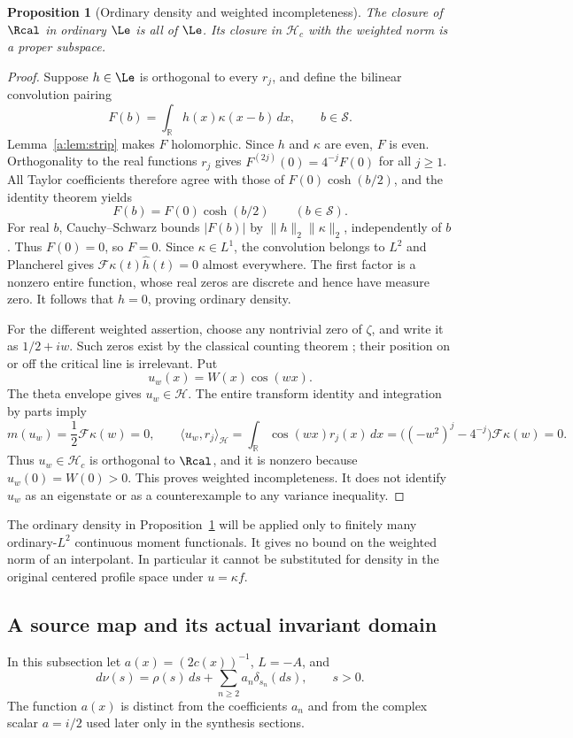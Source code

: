 \documentclass[11pt,a4paper]{article}
\numberwithin{equation}{section}
\newtheorem{proposition}[theorem]{Proposition}
\theoremstyle{definition}\newtheorem{definition}[theorem]{Definition}
\theoremstyle{remark}\newtheorem{remark}[theorem]{Remark}
\newcommand{\R}{\mathbb R}\newcommand{\C}{\mathbb C}\newcommand{\N}{\mathbb N}
\newcommand{\Hh}{\mathcal H}\newcommand{\Hw}{\mathcal H}
\newcommand{\ip}[2]{\langle#1,#2\rangle}\newcommand{\norm}[1]{\lVert#1\rVert}\newcommand{\abs}[1]{\lvert#1\rvert}
\begin{document}
\begin{proposition}[Ordinary density and weighted incompleteness]\label{a:prop:density}
The closure of $\Rcal$ in ordinary $\Le$ is all of $\Le$. Its closure in $\Hh_c$ with the weighted norm is a proper subspace.
\end{proposition}
\begin{proof}
Suppose $h\in\Le$ is orthogonal to every $r_j$, and define the bilinear convolution pairing
\[
 F(b)=\int_\R h(x)\kappa(x-b)\,dx,\qquad b\in\mathcal S.
\]
Lemma~\ref{a:lem:strip} makes $F$ holomorphic. Since $h$ and $\kappa$ are even, $F$ is even. Orthogonality to the real functions $r_j$ gives
$F^{(2j)}(0)=4^{-j}F(0)$ for all $j\ge1$.
All Taylor coefficients therefore agree with those of $F(0)\cosh(b/2)$, and the identity theorem yields
\[
 F(b)=F(0)\cosh(b/2)\qquad(b\in\mathcal S).
\]
For real $b$, Cauchy--Schwarz bounds $|F(b)|$ by
$\norm h_2\norm\kappa_2$, independently of $b$. Thus $F(0)=0$, so $F=0$. Since $\kappa\in L^1$, the convolution belongs to $L^2$ and Plancherel gives
$\mathcal F\kappa(t)\widehat h(t)=0$ almost everywhere. The first factor is a nonzero entire function, whose real zeros are discrete and hence have measure zero. It follows that $h=0$, proving ordinary density.

For the different weighted assertion, choose any nontrivial zero of $\zeta$, and write it as $1/2+iw$. Such zeros exist by the classical counting theorem \cite{vonMangoldt}; their position on or off the critical line is irrelevant. Put
\[
 u_w(x)=W(x)\cos(wx).
\]
The theta envelope gives $u_w\in\Hw$. The entire transform identity and integration by parts imply
\[
 m(u_w)=\frac12\mathcal F\kappa(w)=0,\qquad
 \ip{u_w}{r_j}_{\Hh}
 =\int_\R\cos(wx)r_j(x)\,dx
 =\bigl((-w^2)^j-4^{-j}\bigr)\mathcal F\kappa(w)=0.
\]
Thus $u_w\in \Hh_c$ is orthogonal to $\Rcal$, and it is nonzero because $u_w(0)=W(0)>0$. This proves weighted incompleteness. It does not identify $u_w$ as an eigenstate or as a counterexample to any variance inequality.
\end{proof}

The ordinary density in Proposition~\ref{a:prop:density} will be applied only to finitely many ordinary-$L^2$ continuous moment functionals. It gives no bound on the weighted norm of an interpolant. In particular it cannot be substituted for density in the original centered profile space under $u=\kappa f$.


\subsection{A source map and its actual invariant domain}\label{b:sec:source}
In this subsection let $a(x)=(2c(x))^{-1}$, $L=-A$, and
\begin{equation}\label{b:eq:nu}
 d\nu(s)=\rho(s)\,ds+\sum_{n\ge2}a_n\delta_{s_n}(ds),\qquad s>0.
\end{equation}
The function $a(x)$ is distinct from the coefficients $a_n$ and from the complex scalar $a=i/2$ used later only in the synthesis sections.
\end{document}
